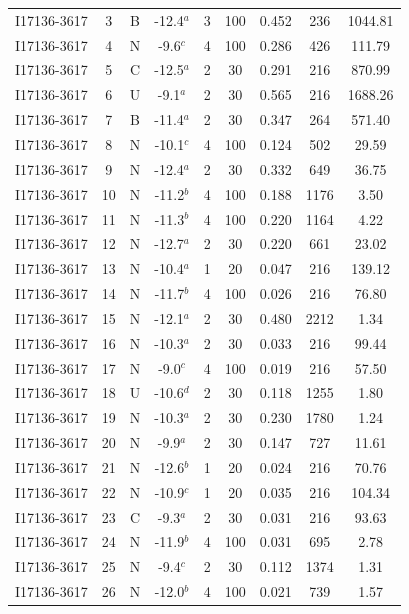 \begin{table}
\begin{tabular}{ccccccccc}
I17136-3617 & 3 & B & -12.4$^{a}$ & 3 & 100 & 0.452 & 236 & 1044.81 \\
I17136-3617 & 4 & N & -9.6$^{c}$ & 4 & 100 & 0.286 & 426 & 111.79 \\
I17136-3617 & 5 & C & -12.5$^{a}$ & 2 & 30 & 0.291 & 216 & 870.99 \\
I17136-3617 & 6 & U & -9.1$^{a}$ & 2 & 30 & 0.565 & 216 & 1688.26 \\
I17136-3617 & 7 & B & -11.4$^{a}$ & 2 & 30 & 0.347 & 264 & 571.40 \\
I17136-3617 & 8 & N & -10.1$^{c}$ & 4 & 100 & 0.124 & 502 & 29.59 \\
I17136-3617 & 9 & N & -12.4$^{a}$ & 2 & 30 & 0.332 & 649 & 36.75 \\
I17136-3617 & 10 & N & -11.2$^{b}$ & 4 & 100 & 0.188 & 1176 & 3.50 \\
I17136-3617 & 11 & N & -11.3$^{b}$ & 4 & 100 & 0.220 & 1164 & 4.22 \\
I17136-3617 & 12 & N & -12.7$^{a}$ & 2 & 30 & 0.220 & 661 & 23.02 \\
I17136-3617 & 13 & N & -10.4$^{a}$ & 1 & 20 & 0.047 & 216 & 139.12 \\
I17136-3617 & 14 & N & -11.7$^{b}$ & 4 & 100 & 0.026 & 216 & 76.80 \\
I17136-3617 & 15 & N & -12.1$^{a}$ & 2 & 30 & 0.480 & 2212 & 1.34 \\
I17136-3617 & 16 & N & -10.3$^{a}$ & 2 & 30 & 0.033 & 216 & 99.44 \\
I17136-3617 & 17 & N & -9.0$^{c}$ & 4 & 100 & 0.019 & 216 & 57.50 \\
I17136-3617 & 18 & U & -10.6$^{d}$ & 2 & 30 & 0.118 & 1255 & 1.80 \\
I17136-3617 & 19 & N & -10.3$^{a}$ & 2 & 30 & 0.230 & 1780 & 1.24 \\
I17136-3617 & 20 & N & -9.9$^{a}$ & 2 & 30 & 0.147 & 727 & 11.61 \\
I17136-3617 & 21 & N & -12.6$^{b}$ & 1 & 20 & 0.024 & 216 & 70.76 \\
I17136-3617 & 22 & N & -10.9$^{c}$ & 1 & 20 & 0.035 & 216 & 104.34 \\
I17136-3617 & 23 & C & -9.3$^{a}$ & 2 & 30 & 0.031 & 216 & 93.63 \\
I17136-3617 & 24 & N & -11.9$^{b}$ & 4 & 100 & 0.031 & 695 & 2.78 \\
I17136-3617 & 25 & N & -9.4$^{c}$ & 2 & 30 & 0.112 & 1374 & 1.31 \\
I17136-3617 & 26 & N & -12.0$^{b}$ & 4 & 100 & 0.021 & 739 & 1.57 \\

\end{tabular}
\end{table}
